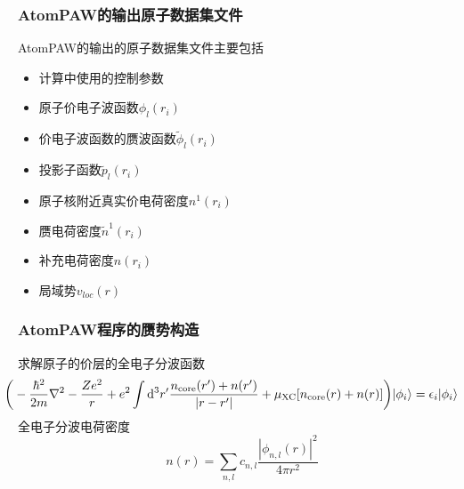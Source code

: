 {{\frame
{
	\frametitle{\textrm{AtomPAW}的输出原子数据集文件}
	\textrm{AtomPAW}的输出的原子数据集文件主要包括
	\begin{itemize}
		\item 计算中使用的控制参数
		\item 原子价电子波函数$\phi_l(r_i)$
		\item 价电子波函数的赝波函数$\tilde\phi_l(r_i)$
		\item 投影子函数$\tilde p_l(r_i)$
		\item 原子核附近真实价电荷密度$n^1(r_i)$
		\item 赝电荷密度$\tilde n^1(r_i)$
		\item 补充电荷密度$\hat n(r_i)$
		\item 局域势$v_{loc}(r)$
	\end{itemize}
}

\frame
{
	\frametitle{\textrm{AtomPAW}程序的赝势构造}
	求解原子的价层的全电子分波函数
	{\fontsize{9.0pt}{5.2pt}\selectfont$$\hspace*{-17pt}\bigg(-\dfrac{\hbar^2}{2m}\nabla^2-\dfrac{Ze^2}r+e^2\int\mathrm{d}^3r^{\prime}\dfrac{n_{\mathrm{core}}(r^{\prime})+n(r^{\prime})}{|r-r^{\prime}|}+\mu_{\mathrm{XC}}[n_{\mathrm{core}}(r)+n(r)]\bigg)|\phi_i\rangle=\epsilon_i|\phi_i\rangle$$}
	全电子分波电荷密度
	$$n(r)=\sum_{n,l}c_{n,l}\dfrac{|\phi_{n,l}(r)|^2}{4\pi r^2}$$
}

}}
